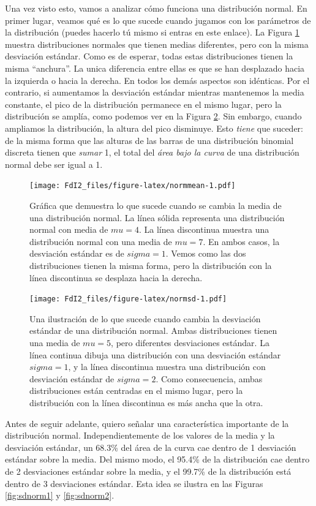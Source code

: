 \documentclass[spanish,]{book}
\begin{document}
Una vez visto esto, vamos a analizar cómo funciona una distribución
normal. En primer lugar, veamos qué es lo que sucede cuando jugamos con
los parámetros de la distribución (puedes hacerlo tú mismo si entras en
este enlace). La Figura \ref{fig:normmean} muestra distribuciones
normales que tienen medias diferentes, pero con la misma desviación
estándar. Como es de esperar, todas estas distribuciones tienen la misma
``anchura''. La unica diferencia entre ellas es que se han desplazado
hacia la izquierda o hacia la derecha. En todos los demás aspectos son
idénticas. Por el contrario, si aumentamos la desviación estándar
mientras mantenemos la media constante, el pico de la distribución
permanece en el mismo lugar, pero la distribución se amplía, como
podemos ver en la Figura \ref{fig:normsd}. Sin embargo, cuando ampliamos
la distribución, la altura del pico disminuye. Esto \emph{tiene} que
suceder: de la misma forma que las alturas de las barras de una
distribución binomial discreta tienen que \emph{sumar} 1, el total del
\emph{área bajo la curva} de una distribución normal debe ser igual a 1.

\begin{figure}
\centering
\texttt{[image: FdI2\_files/figure-latex/normmean-1.pdf]}
\caption{\label{fig:normmean}Gráfica que demuestra lo que sucede cuando se
cambia la media de una distribución normal. La línea sólida representa
una distribución normal con media de \(mu=4\). La línea discontinua
muestra una distribución normal con una media de \(mu=7\). En ambos
casos, la desviación estándar es de \(sigma=1\). Vemos como las dos
distribuciones tienen la misma forma, pero la distribución con la línea
discontinua se desplaza hacia la derecha.}
\end{figure}

\begin{figure}
\centering
\texttt{[image: FdI2\_files/figure-latex/normsd-1.pdf]}
\caption{\label{fig:normsd}Una ilustración de lo que sucede cuando cambia la
desviación estándar de una distribución normal. Ambas distribuciones
tienen una media de \(mu=5\), pero diferentes desviaciones estándar. La
línea continua dibuja una distribución con una desviación estándar
\(sigma=1\), y la línea discontinua muestra una distribución con
desviación estándar de \(sigma=2\). Como consecuencia, ambas
distribuciones están centradas en el mismo lugar, pero la distribución
con la línea discontinua es más ancha que la otra.}
\end{figure}

Antes de seguir adelante, quiero señalar una característica importante
de la distribución normal. Independientemente de los valores de la media
y la desviación estándar, un 68.3\% del área de la curva cae dentro de 1
desviación estándar sobre la media. Del mismo modo, el 95.4\% de la
distribución cae dentro de 2 desviaciones estándar sobre la media, y el
99.7\% de la distribución está dentro de 3 desviaciones estándar. Esta
idea se ilustra en las Figuras \ref{fig:sdnorm1} y \ref{fig:sdnorm2}.
\end{document}
